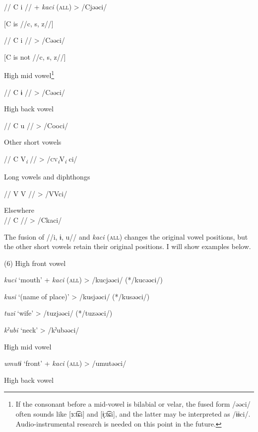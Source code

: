     //  C  i  //  +  \textit{kaci} (\textsc{all})  >  /Cjəəci/

    [C is //c, s, z//]

    //  C  i  //      >  /Cəəci/

    [C is not //c, s, z//]

 \ex High mid vowel\footnote{If the consonant before a mid-vowel is bilabial or velar, the fused form /əəci/ often sounds like [ɜːt͡ɕi] and [ɨ̞ːt͡ɕi], and the latter may be interpreted as /ɨɨci/. Audio-instrumental research is needed on this point in the future.}\\
\gll

    //  C  ɨ  //      >  /Cəəci/

 \ex High back vowel\\
\gll

    //  C  u  //      >  /Cooci/

 \ex Other short vowels\\
\gll

    //  C  V\textit{\textsubscript{i}}  //      >  /\textsc{cv}\textit{\textsubscript{i}}V\textit{\textsubscript{i} }ci/

 \ex Long vowels and diphthongs\\
\gll

    //  V  V  //      >  /VVci/

\ex  Elsewhere\\

    //  C  //        >  /Ckaci/

The fusion of //i, ɨ, u// and \textit{kaci} (\textsc{all}) changes the original vowel positions, but the other short vowels retain their original positions. I will show examples below.

(6) \ea High front vowel  \\
\gll

    \textit{kuci}  ‘mouth’  +  \textit{kaci} (\textsc{all})  >  /kucjəəci/  (*/kucəəci/)

    \textit{kusi}  ‘(name of place)’      >  /kusjəəci/  (*/kusəəci/)

    \textit{tuzi}  ‘wife’      >  /tuzjəəci/  (*/tuzəəci/)

    \textit{kˀubi}  ‘neck’      >  /kˀubəəci/  

 \ex High mid vowel\\
\gll

    \textit{umutɨ}  ‘front’  +  \textit{kaci} (\textsc{all})  >  /umutəəci/

 \ex High back vowel  \\
\gll

